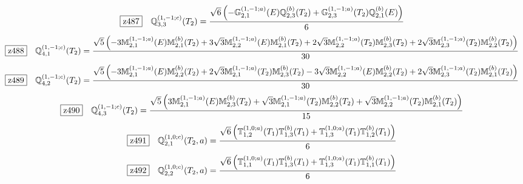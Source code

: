 \documentclass[fleqn,10pt,landscape]{jsarticle}
\begin{document}
\begin{dmath*}
\hspace*{3mm}\fbox{z487}\quad \mathbb{Q}_{3,3}^{(1,-1;c)}(T_{2})=\frac{\sqrt{6} \left(- \mathbb{G}_{2,1}^{(1,-1;a)}(E) \mathbb{Q}_{2,3}^{(b)}(T_{2}) + \mathbb{G}_{2,3}^{(1,-1;a)}(T_{2}) \mathbb{Q}_{2,1}^{(b)}(E)\right)}{6}
\end{dmath*}
\begin{dmath*}
\hspace*{3mm}\fbox{z488}\quad \mathbb{Q}_{4,1}^{(1,-1;c)}(T_{2})=\frac{\sqrt{5} \left(- 3 \mathbb{M}_{2,1}^{(1,-1;a)}(E) \mathbb{M}_{2,1}^{(b)}(T_{2}) + 3 \sqrt{3} \mathbb{M}_{2,2}^{(1,-1;a)}(E) \mathbb{M}_{2,1}^{(b)}(T_{2}) + 2 \sqrt{3} \mathbb{M}_{2,2}^{(1,-1;a)}(T_{2}) \mathbb{M}_{2,3}^{(b)}(T_{2}) + 2 \sqrt{3} \mathbb{M}_{2,3}^{(1,-1;a)}(T_{2}) \mathbb{M}_{2,2}^{(b)}(T_{2})\right)}{30}
\end{dmath*}
\begin{dmath*}
\hspace*{3mm}\fbox{z489}\quad \mathbb{Q}_{4,2}^{(1,-1;c)}(T_{2})=\frac{\sqrt{5} \left(- 3 \mathbb{M}_{2,1}^{(1,-1;a)}(E) \mathbb{M}_{2,2}^{(b)}(T_{2}) + 2 \sqrt{3} \mathbb{M}_{2,1}^{(1,-1;a)}(T_{2}) \mathbb{M}_{2,3}^{(b)}(T_{2}) - 3 \sqrt{3} \mathbb{M}_{2,2}^{(1,-1;a)}(E) \mathbb{M}_{2,2}^{(b)}(T_{2}) + 2 \sqrt{3} \mathbb{M}_{2,3}^{(1,-1;a)}(T_{2}) \mathbb{M}_{2,1}^{(b)}(T_{2})\right)}{30}
\end{dmath*}
\begin{dmath*}
\hspace*{3mm}\fbox{z490}\quad \mathbb{Q}_{4,3}^{(1,-1;c)}(T_{2})=\frac{\sqrt{5} \left(3 \mathbb{M}_{2,1}^{(1,-1;a)}(E) \mathbb{M}_{2,3}^{(b)}(T_{2}) + \sqrt{3} \mathbb{M}_{2,1}^{(1,-1;a)}(T_{2}) \mathbb{M}_{2,2}^{(b)}(T_{2}) + \sqrt{3} \mathbb{M}_{2,2}^{(1,-1;a)}(T_{2}) \mathbb{M}_{2,1}^{(b)}(T_{2})\right)}{15}
\end{dmath*}
\begin{dmath*}
\hspace*{3mm}\fbox{z491}\quad \mathbb{Q}_{2,1}^{(1,0;c)}(T_{2},a)=\frac{\sqrt{6} \left(\mathbb{T}_{1,2}^{(1,0;a)}(T_{1}) \mathbb{T}_{1,3}^{(b)}(T_{1}) + \mathbb{T}_{1,3}^{(1,0;a)}(T_{1}) \mathbb{T}_{1,2}^{(b)}(T_{1})\right)}{6}
\end{dmath*}
\begin{dmath*}
\hspace*{3mm}\fbox{z492}\quad \mathbb{Q}_{2,2}^{(1,0;c)}(T_{2},a)=\frac{\sqrt{6} \left(\mathbb{T}_{1,1}^{(1,0;a)}(T_{1}) \mathbb{T}_{1,3}^{(b)}(T_{1}) + \mathbb{T}_{1,3}^{(1,0;a)}(T_{1}) \mathbb{T}_{1,1}^{(b)}(T_{1})\right)}{6}
\end{dmath*}
\end{document}
